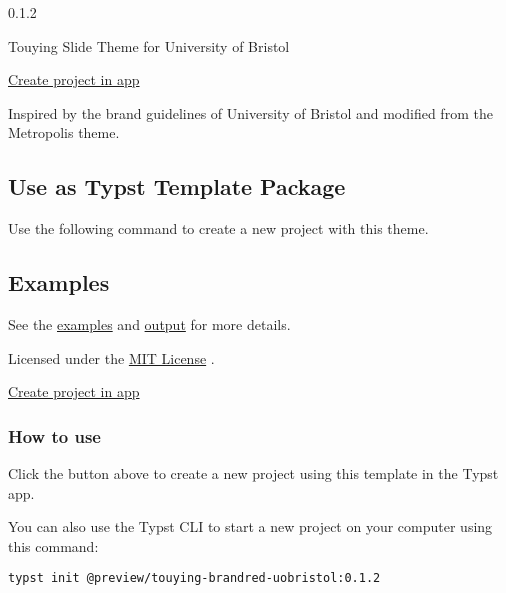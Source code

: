 { 0.1.2 }

Touying Slide Theme for University of Bristol

\href{/app?template=touying-brandred-uobristol&version=0.1.2}{Create
project in app}

\label{readme}
Inspired by the brand guidelines of University of Bristol and modified
from the Metropolis theme.

\subsection{Use as Typst Template
Package}\label{use-as-typst-template-package}

Use the following command to create a new project with this theme.

\begin{Shaded}
\begin{Highlighting}[]
\end{Highlighting}
\end{Shaded}

\subsection{Examples}\label{examples}

See the
\href{https://github.com/typst/packages/raw/main/packages/preview/touying-brandred-uobristol/0.1.2/examples/example.typ}{examples}
and
\href{https://github.com/typst/packages/raw/main/packages/preview/touying-brandred-uobristol/0.1.2/examples/example.pdf}{output}
for more details.

Licensed under the
\href{https://github.com/typst/packages/raw/main/packages/preview/touying-brandred-uobristol/0.1.2/LICENSE}{MIT
License} .

\href{/app?template=touying-brandred-uobristol&version=0.1.2}{Create
project in app}

\subsubsection{How to use}\label{how-to-use}

Click the button above to create a new project using this template in
the Typst app.

You can also use the Typst CLI to start a new project on your computer
using this command:

\begin{verbatim}
typst init @preview/touying-brandred-uobristol:0.1.2
\end{verbatim}


